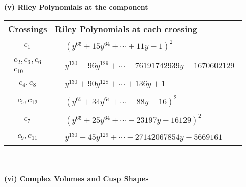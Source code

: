 \documentclass[1p]{elsarticle_modified}
\theoremstyle{definition}
\begin{document}
\newpage\renewcommand{\arraystretch}{1}
\flushleft \textbf{(v) Riley Polynomials at the component}\newline \\
\begin{tabular}{m{50pt}|m{274pt}}
Crossings & \hspace{64pt}Riley Polynomials at each crossing \\
\hline $$\begin{aligned}c_{1}\end{aligned}$$&$\begin{aligned}
&(y^{65}+15 y^{64}+\cdots+11 y-1)^{2}
\end{aligned}$\\
\hline $$\begin{aligned}c_{2},c_{3},c_{6}\\c_{10}\end{aligned}$$&$\begin{aligned}
&y^{130}-96 y^{129}+\cdots-76191742939 y+1670602129
\end{aligned}$\\
\hline $$\begin{aligned}c_{4},c_{8}\end{aligned}$$&$\begin{aligned}
&y^{130}+90 y^{128}+\cdots+136 y+1
\end{aligned}$\\
\hline $$\begin{aligned}c_{5},c_{12}\end{aligned}$$&$\begin{aligned}
&(y^{65}+34 y^{64}+\cdots-88 y-16)^{2}
\end{aligned}$\\
\hline $$\begin{aligned}c_{7}\end{aligned}$$&$\begin{aligned}
&(y^{65}+25 y^{64}+\cdots-23197 y-16129)^{2}
\end{aligned}$\\
\hline $$\begin{aligned}c_{9},c_{11}\end{aligned}$$&$\begin{aligned}
&y^{130}-45 y^{129}+\cdots-27142067854 y+5669161
\end{aligned}$\\
\hline
\end{tabular}\\~\\
\newpage\flushleft \textbf{(vi) Complex Volumes and Cusp Shapes}
\end{document}
